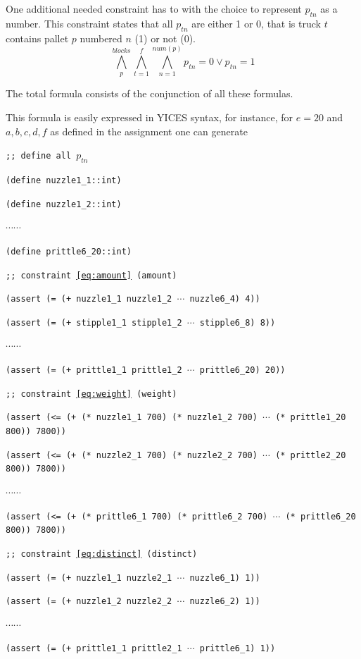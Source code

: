\documentclass[12pt]{article}
\begin{document}
One additional needed constraint has to with the choice to represent $p_{tn}$
as a number. This constraint states that all $p_{tn}$ are either 1 or 0, that is
truck $t$ contains pallet $p$ numbered $n$ (1) or not (0).
\begin{equation} \label{eq:range}
  \bigwedge_p^{blocks} \bigwedge_{t=1}^f \bigwedge_{n=1}^{num(p)} 
	p_{tn} = 0 \vee p_{tn} = 1
\end{equation}

The total formula consists of the conjunction of all these formulas.

This formula is easily expressed in YICES syntax, for instance, for
$e=20$ and $a,b,c,d,f$ as defined in the assignment one can generate

{\footnotesize

{\tt ;; define all $p_{tn}$ }

{\tt (define nuzzle1\_1::int) }

{\tt (define nuzzle1\_2::int) }

$\cdots \cdots$

{\tt (define prittle6\_20::int) }

{\tt ;; constraint~\ref{eq:amount} (amount)}

{\tt (assert (= (+ nuzzle1\_1 nuzzle1\_2 $\cdots$ nuzzle6\_4) 4))}

{\tt (assert (= (+ stipple1\_1 stipple1\_2 $\cdots$ stipple6\_8) 8))}

$\cdots \cdots$

{\tt (assert (= (+ prittle1\_1 prittle1\_2 $\cdots$ prittle6\_20) 20))}

{\tt ;; constraint~\ref{eq:weight} (weight)}

{\tt (assert (<= (+ (* nuzzle1\_1 700) (* nuzzle1\_2 700) $\cdots$ 
		(* prittle1\_20 800)) 7800))}

{\tt (assert (<= (+ (* nuzzle2\_1 700) (* nuzzle2\_2 700) $\cdots$ 
		(* prittle2\_20 800)) 7800))}

$\cdots \cdots$

{\tt (assert (<= (+ (* prittle6\_1 700) (* prittle6\_2 700) $\cdots$ 
		(* prittle6\_20 800)) 7800))}
}

{\tt ;; constraint~\ref{eq:distinct} (distinct)}

{\tt (assert (= (+ nuzzle1\_1 nuzzle2\_1 $\cdots$ nuzzle6\_1) 1))}

{\tt (assert (= (+ nuzzle1\_2 nuzzle2\_2 $\cdots$ nuzzle6\_2) 1))}

$\cdots \cdots$

{\tt (assert (= (+ prittle1\_1 prittle2\_1 $\cdots$ prittle6\_1) 1))}
\end{document}
